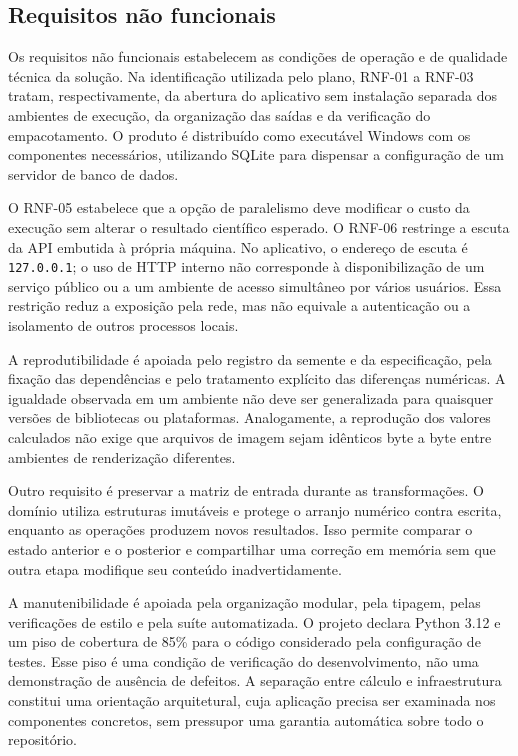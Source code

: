 \subsection{Requisitos não funcionais}

Os requisitos não funcionais estabelecem as condições de operação e de qualidade técnica da solução. Na identificação utilizada pelo plano, RNF-01 a RNF-03 tratam, respectivamente, da abertura do aplicativo sem instalação separada dos ambientes de execução, da organização das saídas e da verificação do empacotamento. O produto é distribuído como executável Windows com os componentes necessários, utilizando SQLite para dispensar a configuração de um servidor de banco de dados.

O RNF-05 estabelece que a opção de paralelismo deve modificar o custo da execução sem alterar o resultado científico esperado. O RNF-06 restringe a escuta da API embutida à própria máquina. No aplicativo, o endereço de escuta é \texttt{127.0.0.1}; o uso de HTTP interno não corresponde à disponibilização de um serviço público ou a um ambiente de acesso simultâneo por vários usuários. Essa restrição reduz a exposição pela rede, mas não equivale a autenticação ou a isolamento de outros processos locais.

A reprodutibilidade é apoiada pelo registro da semente e da especificação, pela fixação das dependências e pelo tratamento explícito das diferenças numéricas. A igualdade observada em um ambiente não deve ser generalizada para quaisquer versões de bibliotecas ou plataformas. Analogamente, a reprodução dos valores calculados não exige que arquivos de imagem sejam idênticos byte a byte entre ambientes de renderização diferentes.

Outro requisito é preservar a matriz de entrada durante as transformações. O domínio utiliza estruturas imutáveis e protege o arranjo numérico contra escrita, enquanto as operações produzem novos resultados. Isso permite comparar o estado anterior e o posterior e compartilhar uma correção em memória sem que outra etapa modifique seu conteúdo inadvertidamente.

A manutenibilidade é apoiada pela organização modular, pela tipagem, pelas verificações de estilo e pela suíte automatizada. O projeto declara Python 3.12 e um piso de cobertura de 85\% para o código considerado pela configuração de testes. Esse piso é uma condição de verificação do desenvolvimento, não uma demonstração de ausência de defeitos. A separação entre cálculo e infraestrutura constitui uma orientação arquitetural, cuja aplicação precisa ser examinada nos componentes concretos, sem pressupor uma garantia automática sobre todo o repositório.

